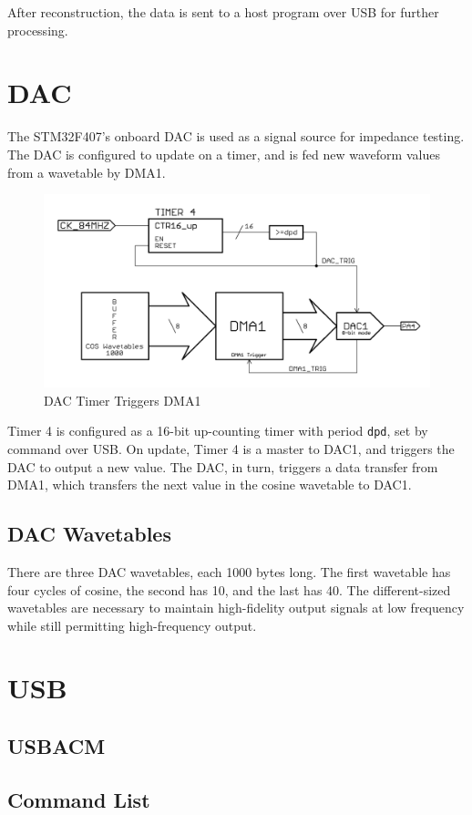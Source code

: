 \documentclass[11pt,twoside]{mitthesis}
\begin{document}
After reconstruction, the data is sent to a host program over USB for further processing.

\section{DAC}

The STM32F407's onboard DAC is used as a signal source for impedance testing.
The DAC is configured to update on a timer, and is fed new waveform values from a wavetable by DMA1.

\begin{figure}[H]
  \begin{center}
      \includegraphics[width=1\textwidth]{../DAC-DMA.png}
      \caption{DAC Timer Triggers DMA1}
  \end{center}
\end{figure}


Timer 4 is configured as a 16-bit up-counting timer with period \texttt{dpd}, set by command over USB.
On update, Timer 4 is a master to DAC1, and triggers the DAC to output a new value.
The DAC, in turn, triggers a data transfer from DMA1, which transfers the next value in the cosine wavetable to DAC1.


\subsection{DAC Wavetables}

There are three DAC wavetables, each 1000 bytes long.
The first wavetable has four cycles of cosine, the second has 10, and the last has 40.
The different-sized wavetables are necessary to maintain high-fidelity output signals at low frequency while still permitting high-frequency output.

\section{USB}


\subsection{USBACM}


\subsection{Command List}


\ifdefined\DEBUG
\end{document}
